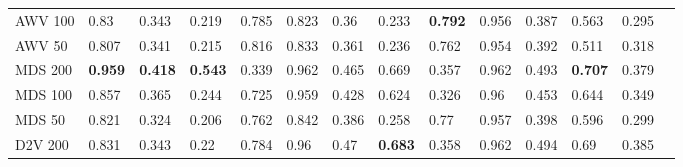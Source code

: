 {\begin{landscape}
\begin{table}[]
\begin{tabular}{llllllllllllll}
AWV 100    & 0.83                            & 0.343                           & 0.219                           & 0.785                           & 0.823                           & 0.36                            & 0.233                           & \textbf{0.792} & 0.956                           & 0.387                           & 0.563                           & 0.295                           &                                 \\
AWV 50     & 0.807                           & 0.341                           & 0.215                           & 0.816                           & 0.833                           & 0.361                           & 0.236                           & 0.762                           & 0.954                           & 0.392                           & 0.511                           & 0.318                           &                                 \\
MDS 200    & \textbf{0.959} & \textbf{0.418} & \textbf{0.543} & 0.339                           & 0.962                           & 0.465                           & 0.669                           & 0.357                           & 0.962                           & 0.493                           & \textbf{0.707} & 0.379                           &                                 \\
MDS 100    & 0.857                           & 0.365                           & 0.244                           & 0.725                           & 0.959                           & 0.428                           & 0.624                           & 0.326                           & 0.96                            & 0.453                           & 0.644                           & 0.349                           &                                 \\
MDS 50     & 0.821                           & 0.324                           & 0.206                           & 0.762                           & 0.842                           & 0.386                           & 0.258                           & 0.77                            & 0.957                           & 0.398                           & 0.596                           & 0.299                           &                                 \\
D2V 200    & 0.831                           & 0.343                           & 0.22                            & 0.784                           & 0.96                            & 0.47                            & \textbf{0.683} & 0.358                           & 0.962                           & 0.494                           & 0.69                            & 0.385                           &                                 \\

\end{tabular}
\end{table}
\end{landscape}}
